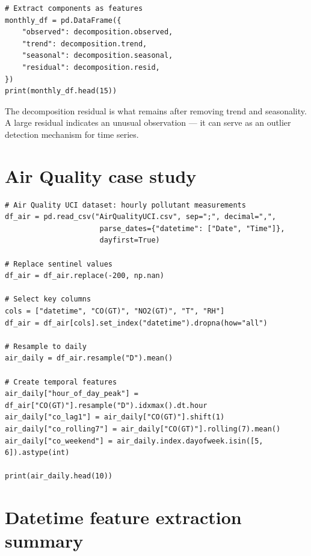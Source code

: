 \begin{verbatim}
# Extract components as features
monthly_df = pd.DataFrame({
    "observed": decomposition.observed,
    "trend": decomposition.trend,
    "seasonal": decomposition.seasonal,
    "residual": decomposition.resid,
})
print(monthly_df.head(15))
\end{verbatim}

\begin{preprocesstip}
The decomposition residual is what remains after removing trend and seasonality. A large residual indicates an unusual observation --- it can serve as an outlier detection mechanism for time series.
\end{preprocesstip}

\section{Air Quality case study}

\begin{verbatim}
# Air Quality UCI dataset: hourly pollutant measurements
df_air = pd.read_csv("AirQualityUCI.csv", sep=";", decimal=",",
                      parse_dates={"datetime": ["Date", "Time"]},
                      dayfirst=True)

# Replace sentinel values
df_air = df_air.replace(-200, np.nan)

# Select key columns
cols = ["datetime", "CO(GT)", "NO2(GT)", "T", "RH"]
df_air = df_air[cols].set_index("datetime").dropna(how="all")

# Resample to daily
air_daily = df_air.resample("D").mean()

# Create temporal features
air_daily["hour_of_day_peak"] = df_air["CO(GT)"].resample("D").idxmax().dt.hour
air_daily["co_lag1"] = air_daily["CO(GT)"].shift(1)
air_daily["co_rolling7"] = air_daily["CO(GT)"].rolling(7).mean()
air_daily["co_weekend"] = air_daily.index.dayofweek.isin([5, 6]).astype(int)

print(air_daily.head(10))
\end{verbatim}

\section{Datetime feature extraction summary}

